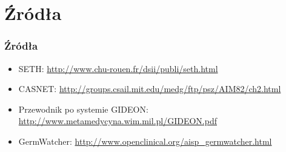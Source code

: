 \section{Źródła}

\begin{frame}
    \frametitle{Źródła}
    \begin{itemize}
        \item SETH: \url{http://www.chu-rouen.fr/dsii/publi/seth.html}
        \item CASNET: \url{http://groups.csail.mit.edu/medg/ftp/psz/AIM82/ch2.html}
        \item Przewodnik po systemie GIDEON:
        \url{http://www.metamedycyna.wim.mil.pl/GIDEON.pdf}
        \item GermWatcher: \url{http://www.openclinical.org/aisp_germwatcher.html}
    \end{itemize}
\end{frame}

